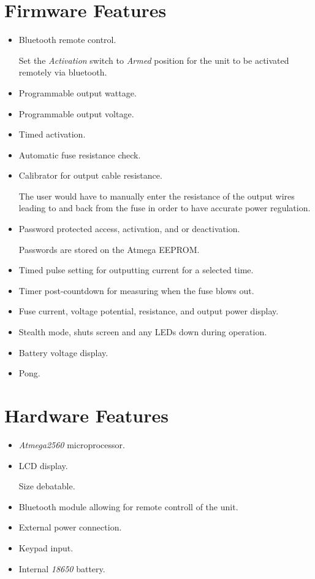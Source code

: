 \documentclass{article}
\begin{document}
\begin{multicols}{2}
\section{Firmware Features}
\begin{itemize}
	\item Bluetooth remote control.
	
	Set the \textit{Activation} switch to \textit{Armed} position for the unit to be activated remotely via bluetooth.
	\item Programmable output wattage.
	\item Programmable output voltage.
	\item Timed activation.
	\item Automatic fuse resistance check.
	\item Calibrator for output cable resistance.
	
	The user would have to manually enter the resistance of the output wires leading to and back from the fuse in order to have accurate power regulation.
	\item Password protected access, activation, and or deactivation.
	
	Passwords are stored on the Atmega EEPROM.
	\item Timed pulse setting for outputting current for a selected time.
	\item Timer post-countdown for measuring when the fuse blows out.
	\item Fuse current, voltage potential, resistance, and output power display.
	\item Stealth mode, shuts screen and any LEDs down during operation.
	\item Battery voltage display.
	\item Pong.


\end{itemize}



\section{Hardware Features}
\begin{itemize}
	\item \textit{Atmega2560} microprocessor.
	\item LCD display.
	
	Size debatable.
	\item Bluetooth module allowing for remote controll of the unit.
	\item External power connection.
	\item Keypad input.
	\item Internal \textit{18650} battery.
	

\end{itemize}
\end{multicols}
\end{document}
